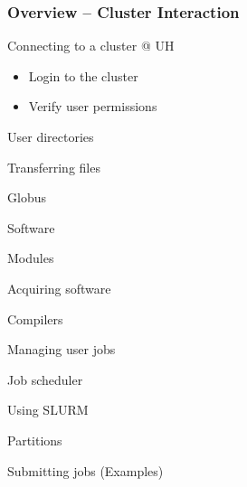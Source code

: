\documentclass[t,hyperref={pdfpagelabels=false}]{beamer}
\newcommand{\semitransp}[2][35]{\color{fg!#1}#2}
\begin{document}
\begin{frame}
	\frametitle{Overview -- Cluster Interaction}
	\begin{itemize}
		\item{Connecting to a cluster @ UH}
			\begin{itemize}
			\item Login to the cluster
			\item Verify user permissions
			\end{itemize}
    {\semitransp[25]{\item User directories
		\item Transferring files
		\begin{itemize}{\semitransp[25]{
			\item Globus
		}}\end{itemize}
		\item Software
		\begin{itemize}{\semitransp[25]{
			\item Modules
			\item Acquiring software
			\item Compilers
			}}
		\end{itemize}
		\item Managing user jobs
		\begin{itemize}{\semitransp[25]{
			\item Job scheduler
			\item Using SLURM
			\item Partitions			
			\item Submitting jobs (Examples)
			}}
		\end{itemize}			
		}}
	\end{itemize}
\end{frame}
\end{document}
